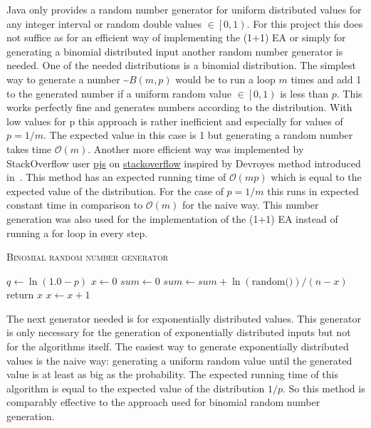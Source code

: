 Java only provides a random number generator for uniform distributed values for any integer interval or random double values $\in \left[0, 1\right)$. For this project this does not suffice as for an efficient way of implementing the (1+1) EA or simply for generating a binomial distributed input another random number generator is needed. One of the needed distributions is a binomial distribution. The simplest way to generate a number \textasciitilde$B(m,p)$ would be to run a loop $m$ times and add 1 to the generated number if a uniform random value $\in \left[0, 1\right)$ is less than $p$. This works perfectly fine and generates numbers according to the distribution. With low values for p this approach is rather inefficient and especially for values of $p=1/m$. The expected value in this case is 1 but generating a random number takes time $\mathcal{O}(m)$. Another more efficient way was implemented by StackOverflow user \href{https://stackoverflow.com/users/2166798/pjs}{pjs} on \href{https://stackoverflow.com/questions/23561551/a-efficient-binomial-random-number-generator-code-in-java}{stackoverflow} inspired by Devroyes method introduced in~\cite{devroye2006nonuniform}. This method has an expected running time of $\mathcal{O}(mp)$ which is equal to the expected value of the distribution. For the case of $p=1/m$ this runs in expected constant time in comparison to $\mathcal{O}(m)$ for the naive way. This number generation was also used for the implementation of the (1+1) EA instead of running a for loop in every step.

\begin{algorithm}[h]
      \caption{\textsc{Binomial random number generator}}\label{alg:binomialRNG}

      \DontPrintSemicolon %
      $q \leftarrow \ln(1.0 - p)$\;
      $x \leftarrow 0$\;
      $sum \leftarrow 0$\;
      {
      $sum \leftarrow sum +\ln(\text{random()}) / (n - x)$\; \tcp{random() generates a random value $\in \left[0, 1\right)$}
      {
            return $x$\;
      }
      $x \leftarrow x + 1$\;
      }
\end{algorithm}

The next generator needed is for exponentially distributed values. This generator is only necessary for the generation of exponentially distributed inputs but not for the algorithms itself. The easiest way to generate exponentially distributed values is the naive way: generating a uniform random value until the generated value is at least as big as the probability. The expected running time of this algorithm is equal to the expected value of the distribution $1/p$. So this method is comparably effective to the approach used for binomial random number generation.

